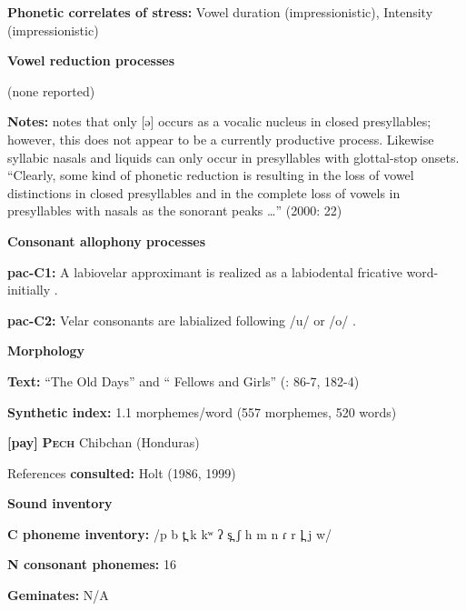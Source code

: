 \textbf{Phonetic correlates of stress:} Vowel duration (impressionistic), Intensity (impressionistic)



\textbf{Vowel reduction processes}



(none reported)



\textbf{Notes:} \citet{Alves2000} notes that only [ə] occurs as a vocalic nucleus in closed presyllables; however, this does not appear to be a currently productive process. Likewise syllabic nasals and liquids can only occur in presyllables with glottal-stop onsets. “Clearly, some kind of phonetic reduction is resulting in the loss of vowel distinctions in closed presyllables and in the complete loss of vowels in presyllables with nasals as the sonorant peaks …” (2000: 22)



\textbf{Consonant allophony processes}



\textbf{pac-C1:} A labiovelar approximant is realized as a labiodental fricative word-initially \citep[11]{Alves2006}.



\textbf{pac-C2:} Velar consonants are labialized following /u/ or /o/ \citep[12]{Alves2006}.



\textbf{Morphology}



\textbf{Text:} “The Old Days” and “ Fellows and Girls” (\citealt{Watson1980}: 86-7, 182-4)



\textbf{Synthetic index:} 1.1 morphemes/word (557 morphemes, 520 words)



\textbf{[pay]}   \textbf{\textsc{Pech}}  Chibchan (Honduras)



References \textbf{consulted:} Holt (1986, 1999)



\textbf{Sound inventory}



\textbf{C phoneme inventory:} /p b t̪ k kʷ ʔ s̪ ʃ h m n ɾ r l̪ j w/



\textbf{N consonant phonemes:} 16



\textbf{Geminates:} N/A



